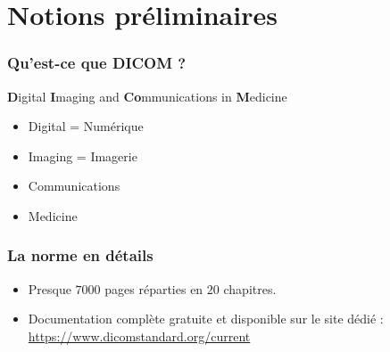 \section{Notions pr\'eliminaires}

	\frame
	{
		\frametitle{Qu'est-ce que DICOM ?}
		
		\begin{block}{\textbf{D}igital \textbf{I}maging and \textbf{Co}mmunications in \textbf{M}edicine}
			\begin{itemize}
				\item<2-> Digital = Num\'erique
		    	\item<2-> Imaging = Imagerie
		    	\item<3-> Communications
		    	\item<4-> Medicine
			\end{itemize}
		\end{block}
	}
	
	\frame
	{
		\frametitle{La norme en d\'etails}
		\begin{itemize}
			\item Presque $7000$ pages r\'eparties en $20$ chapitres.
			\item<2-> Documentation compl\`ete gratuite et disponible sur le site d\'edi\'e : \url{https://www.dicomstandard.org/current}	
		\end{itemize}
	}

